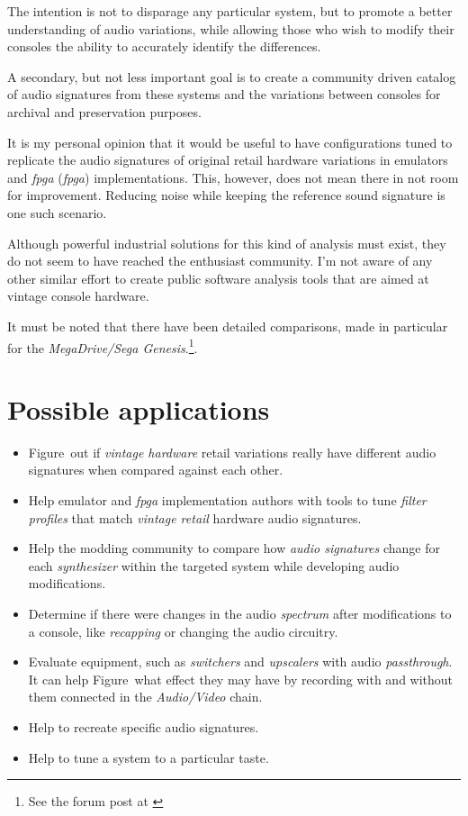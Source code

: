 \documentclass[10pt,a4paper]{report}
\newcommand{\define}[1]{\textit{\acrlong{#1}} (\textit{\acrshort{#1}})}
\newcommand{\ac}[1]{\textit{\mbox{\acrshort{#1}}}}
\begin{document}
The intention is not to disparage any particular system, but to promote a better understanding of audio variations, while allowing those who wish to modify their consoles the ability to accurately identify the differences.

A secondary, but not less important goal is to create a community driven catalog of audio signatures from these systems and the variations between consoles for archival and preservation purposes.

It is my personal opinion that it would be useful to have configurations tuned to replicate the audio signatures of original retail hardware variations in emulators and \define{fpga} implementations. This, however, does not mean there in not room for improvement. Reducing noise while keeping the reference sound signature is one such scenario.

Although powerful industrial solutions for this kind of analysis must exist, they do not seem to have reached the enthusiast community. I'm not aware of any other similar effort to create public software analysis tools that are aimed at vintage console hardware.

It must be noted that there have been detailed comparisons, made in particular for the \textit{MegaDrive/Sega Genesis}.\footnote{See the forum post at \cite{genesisaudio}}. 

\section{Possible applications}

\begin{itemize}
	\item Figure~out if \textit{vintage hardware} retail variations really have different audio signatures when compared against each other.
	\item Help emulator and \ac{fpga} implementation authors with tools to tune \textit{filter profiles} that match \textit{vintage retail} hardware audio signatures.
	\item Help the modding community to compare how \textit{audio signatures} change for each \textit{synthesizer} within the targeted system while developing audio modifications.
	\item Determine if there were changes in the audio \textit{spectrum} after modifications to a console, like \textit{recapping} or changing the audio circuitry.
	\item Evaluate equipment, such as \textit{switchers} and \textit{upscalers} with audio \textit{passthrough}. It can help Figure~what effect they may have by recording with and without them connected in the \textit{Audio/Video} chain.
	\item Help to recreate specific audio signatures.
	\item Help to tune a system to a particular taste.
\end{itemize}
\end{document}
